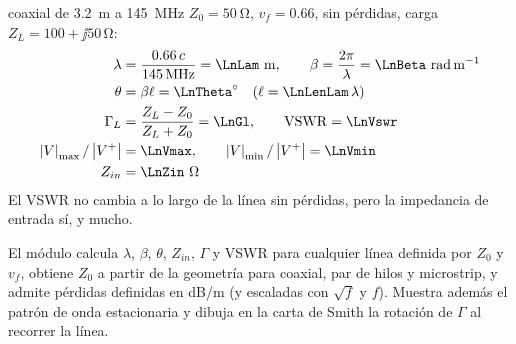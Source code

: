 \begin{ejemplo}{coaxial de \SI{3.2}{\metre} a \SI{145}{\mega\hertz}}
$Z_0 = \SI{50}{\ohm}$, $v_f = 0.66$, sin pérdidas, carga $Z_L = 100 + \jj 50\,\si{\ohm}$:
\begin{align*}
  \lambda &= \frac{0.66\,c}{\SI{145}{\mega\hertz}} = \LnLam~\si{\metre}, \qquad \beta = \frac{2\pi}{\lambda} = \LnBeta~\si{\radian\per\metre}\\
  \theta &= \beta\ell = \LnTheta^\circ \quad(\ell = \LnLenLam\,\lambda)\\
  \Gamma_L &= \frac{Z_L - Z_0}{Z_L + Z_0} = \LnGl, \qquad \mathrm{VSWR} = \LnVswr\\
  \abs{V}_{\max} / \abs{V^+} &= \LnVmax, \qquad \abs{V}_{\min}/\abs{V^+} = \LnVmin\\
  Z_{in} &= \LnZin~\si{\ohm}
\end{align*}
El VSWR no cambia a lo largo de la línea sin pérdidas, pero la impedancia de entrada sí, y mucho.
\end{ejemplo}

\begin{enlaapp}
El módulo  calcula $\lambda$, $\beta$, $\theta$, $Z_{in}$, $\Gamma$ y VSWR para cualquier línea definida por $Z_0$ y $v_f$,
obtiene $Z_0$ a partir de la geometría para coaxial, par de hilos y microstrip, y admite pérdidas definidas en dB/m (y escaladas con $\sqrt f$ y $f$). Muestra además el patrón de onda estacionaria y
dibuja en la carta de Smith la rotación de $\Gamma$ al recorrer la línea.
\end{enlaapp}
